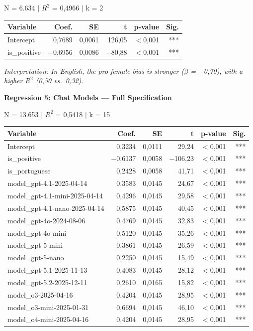 \documentclass[12pt,a4paper]{article}
\begin{document}
\noindent N = 6.634 $|$ $R^2$ = 0,4966 $|$ k = 2

\begin{table}[H]
\centering
\begin{tabular}{lrrrrr}
\toprule
\textbf{Variable} & \textbf{Coef.} & \textbf{SE} & \textbf{t} & \textbf{p-value} & \textbf{Sig.} \\
\midrule
Intercept & 0,7689 & 0,0061 & 126,05 & $<$0,001 & *** \\
is\_positive & $-$0,6956 & 0,0086 & $-$80,88 & $<$0,001 & *** \\
\bottomrule
\end{tabular}
\end{table}
\noindent\textit{Interpretation: In English, the pro-female bias is stronger ($\beta$ = $-$0,70),
with a higher $R^2$ (0,50 vs.\ 0,32).}

\vspace{0.5cm}
\noindent\textbf{Regression 5: Chat Models --- Full Specification}

\noindent N = 13.653 $|$ $R^2$ = 0,5418 $|$ k = 15

\begin{table}[H]
\centering
\small
\begin{tabular}{lrrrrr}
\toprule
\textbf{Variable} & \textbf{Coef.} & \textbf{SE} & \textbf{t} & \textbf{p-value} & \textbf{Sig.} \\
\midrule
Intercept & 0,3234 & 0,0111 & 29,24 & $<$0,001 & *** \\
is\_positive & $-$0,6137 & 0,0058 & $-$106,23 & $<$0,001 & *** \\
is\_portuguese & 0,2428 & 0,0058 & 41,71 & $<$0,001 & *** \\
model\_gpt-4.1-2025-04-14 & 0,3583 & 0,0145 & 24,67 & $<$0,001 & *** \\
model\_gpt-4.1-mini-2025-04-14 & 0,4296 & 0,0145 & 29,58 & $<$0,001 & *** \\
model\_gpt-4.1-nano-2025-04-14 & 0,5875 & 0,0145 & 40,45 & $<$0,001 & *** \\
model\_gpt-4o-2024-08-06 & 0,4769 & 0,0145 & 32,83 & $<$0,001 & *** \\
model\_gpt-4o-mini & 0,5120 & 0,0145 & 35,26 & $<$0,001 & *** \\
model\_gpt-5-mini & 0,3861 & 0,0145 & 26,59 & $<$0,001 & *** \\
model\_gpt-5-nano & 0,2250 & 0,0145 & 15,49 & $<$0,001 & *** \\
model\_gpt-5.1-2025-11-13 & 0,4083 & 0,0145 & 28,12 & $<$0,001 & *** \\
model\_gpt-5.2-2025-12-11 & 0,2610 & 0,0165 & 15,82 & $<$0,001 & *** \\
model\_o3-2025-04-16 & 0,4204 & 0,0145 & 28,95 & $<$0,001 & *** \\
model\_o3-mini-2025-01-31 & 0,6694 & 0,0145 & 46,10 & $<$0,001 & *** \\
model\_o4-mini-2025-04-16 & 0,4204 & 0,0145 & 28,95 & $<$0,001 & *** \\
\bottomrule
\end{tabular}
\end{table}
\end{document}
